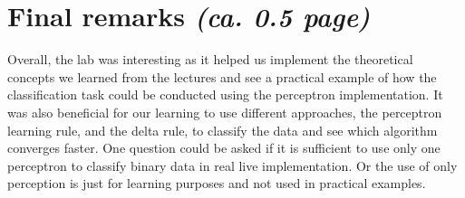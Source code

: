\documentclass[a4paper]{article}
\begin{document}
\section{Final remarks \normalsize{\textit{(ca. 0.5 page)}}} 
Overall, the lab was interesting as it helped us implement the theoretical concepts we learned from the lectures and see a practical example of how the classification task could be conducted using the perceptron implementation. It was also beneficial for our learning to use different approaches, the perceptron learning rule, and the delta rule, to classify the data and see which algorithm converges faster. One question could be asked if it is sufficient to use only one perceptron to classify binary data in real live implementation. Or the use of only perception is just for learning purposes and not used in practical examples. 
\end{document}
